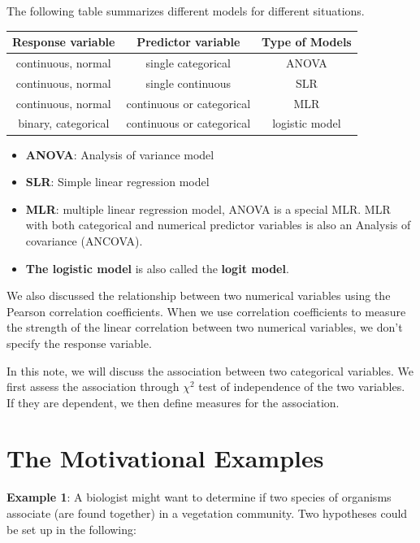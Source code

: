 \documentclass[
]{book}
\begin{document}
The following table summarizes different models for different situations.

\begin{longtable}[]{@{}ccc@{}}
\toprule\noalign{}
Response variable & Predictor variable & Type of Models \\
\midrule\noalign{}
\endhead
\bottomrule\noalign{}
\endlastfoot
continuous, normal & single categorical & ANOVA \\
continuous, normal & single continuous & SLR \\
continuous, normal & continuous or categorical & MLR \\
binary, categorical & continuous or categorical & logistic model \\
\end{longtable}

\begin{itemize}
\item
  \textbf{ANOVA}: Analysis of variance model
\item
  \textbf{SLR}: Simple linear regression model
\item
  \textbf{MLR}: multiple linear regression model, ANOVA is a special MLR. MLR with both categorical and numerical predictor variables is also an Analysis of covariance (ANCOVA).
\item
  \textbf{The logistic model} is also called the \textbf{logit model}.
\end{itemize}

We also discussed the relationship between two numerical variables using the Pearson correlation coefficients. When we use correlation coefficients to measure the strength of the linear correlation between two numerical variables, we don't specify the response variable.

In this note, we will discuss the association between two categorical variables. We first assess the association through \(\chi^2\) test of independence of the two variables. If they are dependent, we then define measures for the association.

\hypertarget{the-motivational-examples}{%
\section{The Motivational Examples}\label{the-motivational-examples}}

\textbf{Example 1}: A biologist might want to determine if two species of organisms associate (are found together) in a vegetation community. Two hypotheses could be set up in the following:
\end{document}
